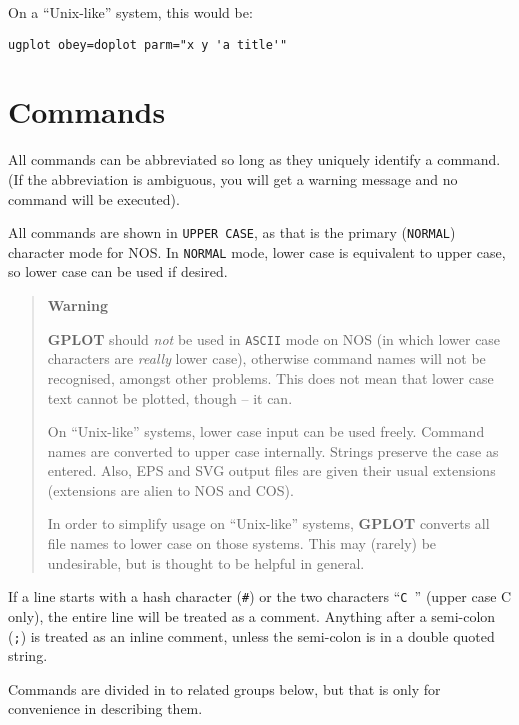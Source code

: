 \documentclass[a4paper,twoside,11pt]{article}
\newcommand{\newpara}{\par\vspace{4mm}\noindent}
\begin{document}
\newpara
On a ``Unix-like'' system, this would be:
\begin{verbatim}
ugplot obey=doplot parm="x y 'a title'"
\end{verbatim}

\section{Commands}
All commands can be abbreviated so long as they uniquely identify a command.
(If the abbreviation is ambiguous, you will get a warning message and no command will
be executed). 
\newpara
All commands are shown in \texttt{UPPER CASE}, as that is the primary (\texttt{NORMAL}) character mode
for NOS. In \texttt{NORMAL} mode, lower case is equivalent to upper case, so lower case can be used
if desired. 

\begin{quote}
\begin{center}
\textbf{Warning}\\
\end{center}
\textbf{GPLOT} should
\textit{not} be used in \texttt{ASCII} mode on NOS (in which lower case characters are \textit{really} lower case),
otherwise command names will not be recognised, amongst other problems.
This does not mean that lower case text cannot be plotted, though -- it can.

\newpara
On ``Unix-like'' systems, lower case input can be used freely. Command names are converted to upper case internally.
Strings preserve the case as entered. Also, EPS and SVG output files are given their usual extensions
(extensions are alien to NOS and COS).

\newpara
In order to simplify usage on ``Unix-like'' systems, \textbf{GPLOT} converts all file names to lower case on those
systems. This may (rarely) be undesirable, but is thought to be helpful in general.
\end{quote}

\newpara
If a line starts with a hash character (\texttt{\#}) or the two characters ``\texttt{C }'' (upper case C only), the entire line
will be treated as a comment. Anything after a semi-colon (\texttt{;}) is treated as an inline comment, unless the semi-colon is in
a double quoted string.

\newpara
Commands are divided in to related groups below, but that is only for 
convenience in describing them.
\end{document}
